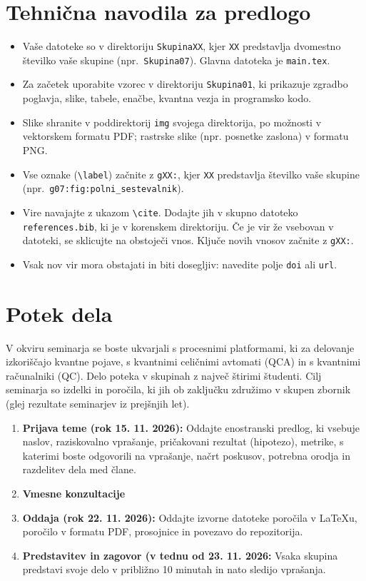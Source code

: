 
\section*{Tehnična navodila za predlogo}
\begin{itemize}
\item Vaše datoteke so v direktoriju \texttt{SkupinaXX}, kjer \texttt{XX} predstavlja dvomestno številko vaše skupine (npr.\ \texttt{Skupina07}). Glavna datoteka je \texttt{main.tex}.
\item Za začetek uporabite vzorec v direktoriju \texttt{Skupina01}, ki prikazuje zgradbo poglavja, slike, tabele, enačbe, kvantna vezja in programsko kodo.
\item Slike shranite v poddirektorij \texttt{img} svojega direktorija, po možnosti v vektorskem formatu PDF; rastrske slike (npr. posnetke zaslona) v formatu PNG.
\item Vse oznake (\texttt{\textbackslash label}) začnite z \texttt{gXX:}, kjer \texttt{XX} predstavlja številko vaše skupine (npr.\ \texttt{g07:fig:polni\_sestevalnik}).
\item Vire navajajte z ukazom \texttt{\textbackslash cite}. Dodajte jih v skupno datoteko \texttt{references.bib}, ki je v korenskem direktoriju. Če je vir že vsebovan v datoteki, se sklicujte na obstoječi vnos. Ključe novih vnosov začnite z \texttt{gXX:}.
\item Vsak nov vir mora obstajati in biti dosegljiv: navedite polje \texttt{doi} ali \texttt{url}.
\end{itemize}


\section*{Potek dela}

V okviru seminarja se boste ukvarjali s procesnimi platformami, ki za delovanje izkoriščajo kvantne pojave, s kvantnimi celičnimi avtomati (QCA) in s kvantnimi računalniki (QC). Delo poteka v skupinah z največ štirimi študenti. Cilj seminarja so izdelki in poročila, ki jih ob zaključku združimo v skupen zbornik (glej rezultate seminarjev iz prejšnjih let).

\begin{enumerate}
\item \textbf{Prijava teme (rok 15. 11. 2026):} Oddajte enostranski predlog, ki vsebuje naslov, raziskovalno vprašanje, pričakovani rezultat (hipotezo), metrike, s katerimi boste odgovorili na vprašanje, načrt poskusov, potrebna orodja in razdelitev dela med člane.
\item \textbf{Vmesne konzultacije}
\item \textbf{Oddaja (rok 22. 11. 2026):} Oddajte izvorne datoteke poročila v \LaTeX u, poročilo v formatu PDF, prosojnice in povezavo do repozitorija.
\item \textbf{Predstavitev in zagovor (v tednu od 23. 11. 2026:} Vsaka skupina predstavi svoje delo v približno 10 minutah in nato sledijo vprašanja.
\end{enumerate}

